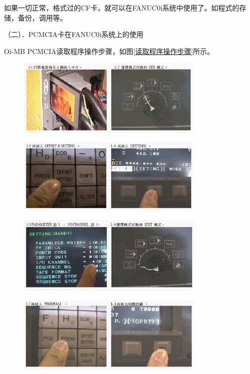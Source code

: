 如果一切正常，格式过的CF卡，就可以在FANUC0i系统中使用了。如程式的存储，备份，调用等。

（二）．PCMCIA卡在FANUC0i系统上的使用

Oi-MB PCMCIA读取程序操作步骤，如图\ref{读取程序操作步骤}所示。
\begin{figure}[!hbtp]
	\centering	\includegraphics[width=0.8\textwidth]{images/14-7}
\end{figure}

\begin{figure}[!hbtp]
	\centering	\includegraphics[width=0.8\textwidth]{images/14-8}
\end{figure}

\begin{figure}[!hbtp]
	\centering	\includegraphics[width=0.8\textwidth]{images/14-9}
\end{figure}


\begin{figure}[!hbtp]
	\centering	\includegraphics[width=0.8\textwidth]{images/14-10}
\end{figure}

